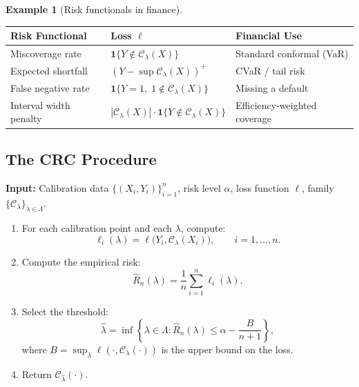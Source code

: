 \documentclass[11pt, a4paper]{article}
\theoremstyle{definition}
\newtheorem{example}{Example}[section]
\theoremstyle{plain}
\theoremstyle{remark}
\newcommand{\ind}{\boldsymbol{1}}
\newcommand{\Ccal}{\mathcal{C}}
\begin{document}
\begin{example}[Risk functionals in finance]\label{ex:risk-functionals}
\begin{center}
\begin{tabular}{@{}p{3.8cm}p{4cm}p{4.8cm}@{}}
\toprule
\textbf{Risk Functional} & \textbf{Loss $\ell$} & \textbf{Financial Use} \\
\midrule
Miscoverage rate
    & $\ind\{Y \notin \Ccal_\lambda(X)\}$
    & Standard conformal (VaR) \\[4pt]
Expected shortfall
    & $(Y - \sup \Ccal_\lambda(X))^+$
    & CVaR / tail risk \\[4pt]
False negative rate
    & $\ind\{Y = 1,\; 1 \notin \Ccal_\lambda(X)\}$
    & Missing a default \\[4pt]
Interval width penalty
    & $|\Ccal_\lambda(X)| \cdot \ind\{Y \notin \Ccal_\lambda(X)\}$
    & Efficiency-weighted coverage \\
\bottomrule
\end{tabular}
\end{center}
\end{example}

\subsection{The CRC Procedure}

\begin{algorithmbox}[title={Algorithm 3: Conformal Risk Control}]
\label{alg:crc}
\textbf{Input:} Calibration data $\{(X_i, Y_i)\}_{i=1}^{n}$, risk level $\alpha$,
loss function $\ell$, family $\{\Ccal_\lambda\}_{\lambda \in \Lambda}$.
\begin{enumerate}
    \item For each calibration point and each $\lambda$, compute:
    \[
        \ell_i(\lambda) = \ell\bigl(Y_i, \Ccal_\lambda(X_i)\bigr),
        \qquad i = 1, \ldots, n.
    \]
    \item Compute the empirical risk:
    \[
        \hat{R}_n(\lambda) = \frac{1}{n} \sum_{i=1}^{n} \ell_i(\lambda).
    \]
    \item Select the threshold:
    \[
        \hat{\lambda} = \inf\!\left\{\lambda \in \Lambda :
        \hat{R}_n(\lambda) \leq \alpha - \frac{B}{n+1}\right\},
    \]
    where $B = \sup_{\lambda} \ell(\cdot, \Ccal_\lambda(\cdot))$ is the upper bound
    on the loss.
    \item Return $\Ccal_{\hat{\lambda}}(\cdot)$.
\end{enumerate}
\end{algorithmbox}
\end{document}
